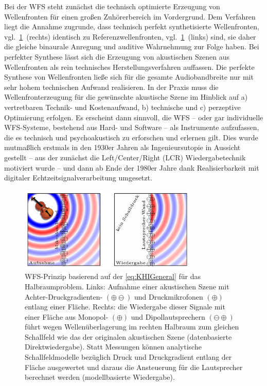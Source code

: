 Bei der WFS steht zunächst die
technisch optimierte Erzeugung von Wellenfronten für einen großen
Zuhörerbereich im Vordergrund.
%
Dem Verfahren liegt die Annahme zugrunde, dass technisch perfekt synthetisierte
Wellenfronten, vgl.~\Abb\ref{fig:violine}~(rechts)
identisch zu Referenzwellenfronten, vgl.~\Abb\ref{fig:violine}~(links) sind,
sie daher die gleiche binaurale Anregung \cite[S.\,573]{Snow1953} und
auditive Wahrnehmung zur Folge haben.
%
Bei perfekter Synthese lässt sich die Erzeugung von akustischen Szenen
aus Wellenfronten als rein technisches Herstellungsverfahren auffassen.
%
Die perfekte Synthese von Wellenfronten ließe sich für die gesamte
Audiobandbreite nur mit sehr hohem technischen Aufwand
realisieren.
%
In der Praxis muss die Wellenfronterzeugung für die gewünschte
akustische Szene im Hinblick auf
a) vertretbaren Technik- und Kostenaufwand,
b) technische und
c) perzeptive Optimierung
erfolgen.
%
Es erscheint dann sinnvoll, die WFS -- oder gar individuelle WFS-Systeme,
bestehend aus Hard- und Software -- als Instrumente aufzufassen, die es
technisch und psychoakustisch zu erforschen und erlernen gilt.
%
Dies wurde mutmaßlich erstmals in den 1930er Jahren als Ingenieursutopie
in Aussicht gestellt \cite{Fletcher1934,Steinberg1934} -- aus der zunächst
die Left/Center/Right (LCR) Wiedergabetechnik
motiviert wurde -- und dann ab
Ende der 1980er Jahre \cite{Berkhout1988_JAES} dank Realisierbarkeit mit
digitaler Echtzeitsignalverarbeitung umgesetzt.
%
\begin{figure}[b]
\centering
\begin{plotfigures}
\includegraphics[width=85mm]{../python/violin_wfs_DEU.png}
\end{plotfigures}
\caption{WFS-Prinzip basierend auf der \Glg\eqref{eq:KHIGeneral} für das
Halbraumproblem.
%
Links: Aufnahme einer akustischen Szene mit Achter-Druckgradienten-
$(\oplus\ominus)$ und Druckmikrofonen $(\oplus)$ entlang einer Fläche.
%
Rechts: die Wiedergabe dieser Signale mit einer Fläche aus
Monopol- $(\oplus)$ und Dipollautsprechern
$(\ominus\oplus)$ führt wegen Wellenüberlagerung im
rechten Halbraum zum gleichen Schallfeld wie das der originalen
akustischen Szene (datenbasierte Direktwiedergabe).
%
Statt Messungen können analytische Schallfeldmodelle
bezüglich Druck und Druckgradient entlang der Fläche ausgewertet und daraus
die Ansteuerung für die Lautsprecher berechnet werden
(modellbasierte Wiedergabe). \cc
}
\label{fig:violine}
\end{figure}



